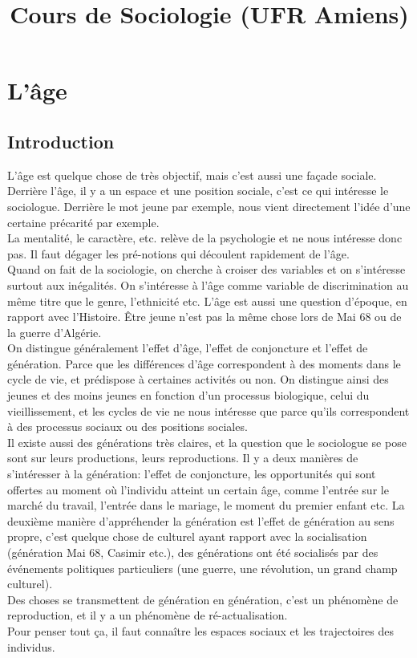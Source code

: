 \documentclass[12pt, a4paper, openany]{book}
\date{}
\title{Cours de Sociologie (UFR Amiens)}
\begin{document}
\chapter{L'âge}

\section{Introduction}

L'âge est quelque chose de très objectif, mais c'est aussi une façade sociale. Derrière l'âge, il y a un espace et une position sociale, c'est ce qui intéresse le sociologue. Derrière le mot jeune par exemple, nous vient directement l'idée d'une certaine précarité par exemple. \\
La mentalité, le caractère, etc. relève de la psychologie et ne nous intéresse donc pas. Il faut dégager les pré-notions qui découlent rapidement de l'âge. \\
Quand on fait de la sociologie, on cherche à croiser des variables et on s'intéresse surtout aux inégalités. On s'intéresse à l'âge comme variable de discrimination au même titre que le genre, l'ethnicité etc. L'âge est aussi une question d'époque, en rapport avec l'Histoire. Être jeune n'est pas la même chose lors de Mai 68 ou de la guerre d'Algérie. \\
On distingue généralement l'effet d'âge, l'effet de conjoncture et l'effet de génération. Parce que les différences d'âge correspondent à des moments dans le cycle de vie, et prédispose à certaines activités ou non. On distingue ainsi des jeunes et des moins jeunes en fonction d'un processus biologique, celui du vieillissement, et les cycles de vie ne nous intéresse que parce qu'ils correspondent à des processus sociaux ou des positions sociales. \\ 
Il existe aussi des générations très claires, et la question que le sociologue se pose sont sur leurs productions, leurs reproductions. Il y a deux manières de s'intéresser à la génération: l'effet de conjoncture, les opportunités qui sont offertes au moment où l'individu atteint un certain âge, comme l'entrée sur le marché du travail, l'entrée dans le mariage, le moment du premier enfant etc. La deuxième manière d'appréhender la génération est l'effet de génération au sens propre, c'est quelque chose de culturel ayant rapport avec la socialisation (génération Mai 68, Casimir etc.), des générations ont été socialisés par des événements politiques particuliers (une guerre, une révolution, un grand champ culturel). \\
Des choses se transmettent de génération en génération, c'est un phénomène de reproduction, et il y a un phénomène de ré-actualisation. \\
Pour penser tout ça, il faut connaître les espaces sociaux et les trajectoires des individus. 
\end{document}
